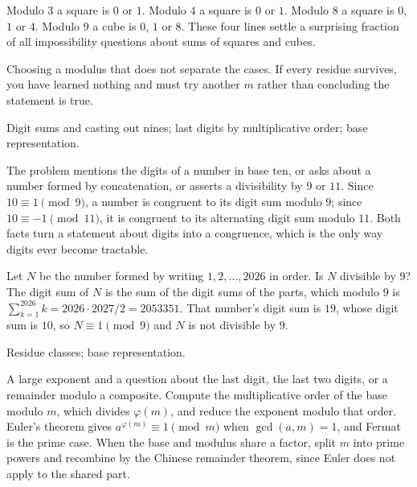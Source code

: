 \begin{keynote}
Modulo $3$ a square is $0$ or $1$. Modulo $4$ a square is $0$ or $1$. Modulo $8$ a square is $0$, $1$ or $4$. Modulo $9$ a cube is $0$, $1$ or $8$. These four lines settle a surprising fraction of all impossibility questions about sums of squares and cubes.
\end{keynote}

\begin{trap}
Choosing a modulus that does not separate the cases. If every residue survives, you have learned nothing and must try another $m$ rather than concluding the statement is true.
\end{trap}

\begin{seealsob}Digit sums and casting out nines; last digits by multiplicative order; base representation.\end{seealsob}

\cue The problem mentions the digits of a number in base ten, or asks about a number formed by concatenation, or asserts a divisibility by $9$ or $11$.
\method Since $10\equiv1\pmod 9$, a number is congruent to its digit sum modulo $9$; since $10\equiv-1\pmod{11}$, it is congruent to its alternating digit sum modulo $11$. Both facts turn a statement about digits into a congruence, which is the only way digits ever become tractable.

\begin{worked}
Let $N$ be the number formed by writing $1,2,\ldots,2026$ in order. Is $N$ divisible by $9$? The digit sum of $N$ is the sum of the digit sums of the parts, which modulo $9$ is $\sum_{k=1}^{2026}k=2026\cdot2027/2=2053351$. That number's digit sum is $19$, whose digit sum is $10$, so $N\equiv1\pmod 9$ and $N$ is not divisible by $9$.
\end{worked}

\begin{seealsob}Residue classes; base representation.\end{seealsob}

\cue A large exponent and a question about the last digit, the last two digits, or a remainder modulo a composite.
\method Compute the multiplicative order of the base modulo $m$, which divides $\varphi(m)$, and reduce the exponent modulo that order. Euler's theorem gives $a^{\varphi(m)}\equiv1\pmod m$ when $\gcd(a,m)=1$, and Fermat is the prime case. When the base and modulus share a factor, split $m$ into prime powers and recombine by the Chinese remainder theorem, since Euler does not apply to the shared part.

